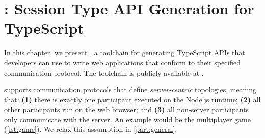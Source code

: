 \chapter{\codegen: Session Type API Generation for TypeScript}
\label{chap:codegen}

In this chapter, we present
\codegen,
a toolchain for generating TypeScript APIs that developers can
use to write web applications that conform to their specified
communication protocol.
The toolchain is publicly available at \cite{repo}.

\codegen supports communication protocols that define 
\emph{server-centric} topologies, meaning that: 
\textbf{(1)} there is exactly one participant executed on the 
Node.js runtime; 
\textbf{(2)} all other participants run on the web browser; and
\textbf{(3)} all non-server participants only communicate with the server.
An example would be the 
multiplayer game (\cref{lst:game}).
We relax this assumption in \cref{part:general}.





